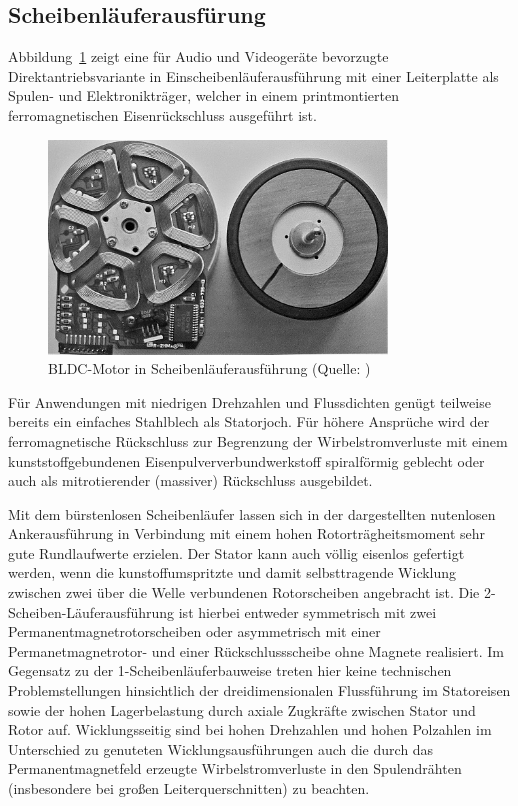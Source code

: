 \subsection{Scheibenläuferausfürung}

Abbildung~\ref{fig:3_3} zeigt eine für Audio und Videogeräte bevorzugte Direktantriebsvariante in Einscheibenläuferausführung mit einer Leiterplatte als Spulen- und Elektronikträger, welcher in einem printmontierten ferromagnetischen Eisenrückschluss ausgeführt ist.

\begin{figure}[h]
  \centering
  \includegraphics[width=9cm]{./Grafiken/3_3}
  \caption[BLDC-Motor in Scheibenläuferausfürung]{BLDC-Motor in Scheibenläuferausführung (Quelle: \parencite[S.  77]{Stölting2011})}%
  \label{fig:3_3}
\end{figure}

Für Anwendungen mit niedrigen Drehzahlen und Flussdichten genügt teilweise bereits ein einfaches Stahlblech als Statorjoch. Für höhere Ansprüche wird der ferromagnetische Rückschluss zur Begrenzung der Wirbelstromverluste mit einem kunststoffgebundenen Eisenpulververbundwerkstoff spiralförmig geblecht oder auch als mitrotierender (massiver) Rückschluss ausgebildet.

Mit dem bürstenlosen Scheibenläufer lassen sich in der dargestellten nutenlosen Ankerausführung in Verbindung mit einem hohen Rotorträgheitsmoment sehr gute Rundlaufwerte erzielen. Der Stator kann auch völlig eisenlos gefertigt werden, wenn die kunstoffumspritzte und damit selbsttragende Wicklung zwischen zwei über die Welle verbundenen Rotorscheiben angebracht ist. Die 2-Scheiben-Läuferausführung ist hierbei entweder symmetrisch mit zwei Permanentmagnetrotorscheiben oder asymmetrisch mit einer Permanetmagnetrotor- und einer Rückschlussscheibe ohne Magnete realisiert. Im Gegensatz zu der 1-Scheibenläuferbauweise treten hier keine technischen Problemstellungen hinsichtlich der dreidimensionalen Flussführung im Statoreisen sowie der hohen Lagerbelastung durch axiale Zugkräfte zwischen Stator und Rotor auf. Wicklungsseitig sind bei hohen Drehzahlen und hohen Polzahlen im Unterschied zu genuteten Wicklungsausführungen auch die durch das Permanentmagnetfeld erzeugte Wirbelstromverluste in den Spulendrähten (insbesondere bei großen Leiterquerschnitten) zu beachten.


